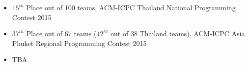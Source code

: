 \documentclass[10pt,a4paper]{altacv}
\begin{document}
\bigskip


\begin{itemize}
	\item $15^{th}$ Place out of 100 teams, ACM-ICPC Thailand National Programming Contest 2015
	\item $37^{th}$ Place out of 67 teams ($12^{th}$ out of 38 Thailand teams), ACM-ICPC Asia Phuket Regional Programming Contest 2015
\end{itemize}

\divider

\begin{itemize}
	\item TBA
\end{itemize}

\medskip
\end{document}
